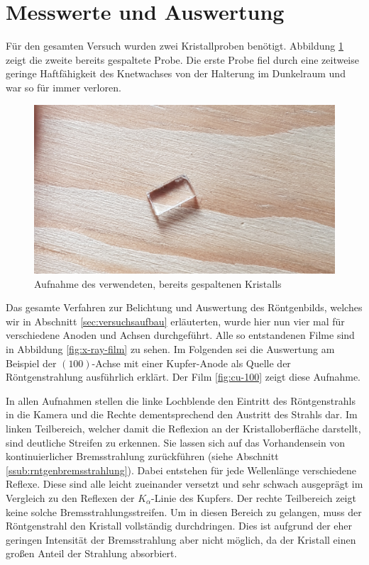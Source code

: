 \section{Messwerte und Auswertung}
\label{sec:messwerte}
	
	Für den gesamten Versuch wurden zwei Kristallproben benötigt.
	Abbildung \ref{fig:kristall} zeigt die zweite bereits gespaltete Probe.
	Die erste Probe fiel durch eine zeitweise geringe Haftfähigkeit des Knetwachses von der Halterung im Dunkelraum und war so für immer verloren.

	\begin{figure}[htb]
		\centering
		\includegraphics[scale=0.12]{images/20160628_111300.jpg}
		\caption{Aufnahme des verwendeten, bereits gespaltenen Kristalls}
		\label{fig:kristall}
	\end{figure}

	Das gesamte Verfahren zur Belichtung und Auswertung des Röntgenbilds, welches wir in Abschnitt \ref{sec:versuchsaufbau} erläuterten, wurde hier nun vier mal für verschiedene Anoden und Achsen durchgeführt.
	Alle so entstandenen Filme sind in Abbildung \ref{fig:x-ray-film} zu sehen.
	Im Folgenden sei die Auswertung am Beispiel der $(100)$-Achse mit einer Kupfer-Anode als Quelle der Röntgenstrahlung ausführlich erklärt.
	Der Film \ref{fig:cu-100} zeigt diese Aufnahme.

	In allen Aufnahmen stellen die linke Lochblende den Eintritt des Röntgenstrahls in die Kamera und die Rechte dementsprechend den Austritt des Strahls dar.
	Im linken Teilbereich, welcher damit die Reflexion an der Kristalloberfläche darstellt, sind deutliche Streifen zu erkennen.
	Sie lassen sich auf das Vorhandensein von kontinuierlicher Bremsstrahlung zurückführen (siehe Abschnitt \ref{ssub:rntgenbremsstrahlung}).
	Dabei entstehen für jede Wellenlänge verschiedene Reflexe.
	Diese sind alle leicht zueinander versetzt und sehr schwach ausgeprägt im Vergleich zu den Reflexen der $K_\alpha$-Linie des Kupfers.
	Der rechte Teilbereich zeigt keine solche Bremsstrahlungsstreifen.
	Um in diesen Bereich zu gelangen, muss der Röntgenstrahl den Kristall vollständig durchdringen.
	Dies ist aufgrund der eher geringen Intensität der Bremsstrahlung aber nicht möglich, da der Kristall einen großen Anteil der Strahlung absorbiert.

